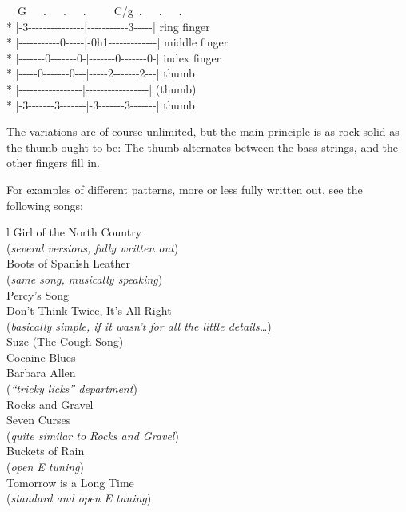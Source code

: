 \begin{pre}
\begin{adjustwidth}{2em}{0em}
~~G~~~.~~~.~~~.~~~~~C/g~.~~~.~~~.\\*
|{-}3{-}{-}{-}{-}{-}{-}{-}{-}{-}{-}{-}{-}{-}{-}{-}|{-}{-}{-}{-}{-}{-}{-}{-}{-}{-}{-}3{-}{-}{-}{-}{-}| ring finger\\*
|{-}{-}{-}{-}{-}{-}{-}{-}{-}{-}{-}0{-}{-}{-}{-}{-}|{-}0h1{-}{-}{-}{-}{-}{-}{-}{-}{-}{-}{-}{-}{-}| middle finger\\*
|{-}{-}{-}{-}{-}{-}{-}0{-}{-}{-}{-}{-}{-}{-}0{-}|{-}{-}{-}{-}{-}{-}{-}0{-}{-}{-}{-}{-}{-}{-}0{-}| index finger\\*
|{-}{-}{-}{-}{-}0{-}{-}{-}{-}{-}{-}{-}0{-}{-}{-}|{-}{-}{-}{-}{-}2{-}{-}{-}{-}{-}{-}{-}2{-}{-}{-}| thumb\\*
|{-}{-}{-}{-}{-}{-}{-}{-}{-}{-}{-}{-}{-}{-}{-}{-}{-}|{-}{-}{-}{-}{-}{-}{-}{-}{-}{-}{-}{-}{-}{-}{-}{-}{-}| (thumb)\\*
|{-}3{-}{-}{-}{-}{-}{-}{-}3{-}{-}{-}{-}{-}{-}{-}|{-}3{-}{-}{-}{-}{-}{-}{-}3{-}{-}{-}{-}{-}{-}{-}| thumb
\end{adjustwidth}
\end{pre}

The variations are of course unlimited, but the main principle is as
rock solid as the thumb ought to be: The thumb alternates between the
bass strings, and the other fingers fill in.

For examples of different patterns, more or less fully written out,
see the following songs:

\begin{ctabular}{l}
Girl of the North Country \\
\hspace{2em} (\textit{several versions, fully written out}) \\
Boots of Spanish Leather \\
\hspace{2em} (\textit{same song, musically speaking}) \\
Percy's Song \\
Don't Think Twice, It's All Right \\
\hspace{2em} (\textit{basically simple, if it wasn't for all the little details\ldots}) \\
Suze (The Cough Song) \\
Cocaine Blues \\
Barbara Allen \\
\hspace{2em} (\textit{``tricky licks'' department}) \\
Rocks and Gravel \\
Seven Curses \\
\hspace{2em} (\textit{quite similar to \textnormal{Rocks and Gravel}}) \\
Buckets of Rain \\
\hspace{2em} (\textit{open E tuning}) \\
Tomorrow is a Long Time \\
\hspace{2em} (\textit{standard and open E tuning})
\end{ctabular}

